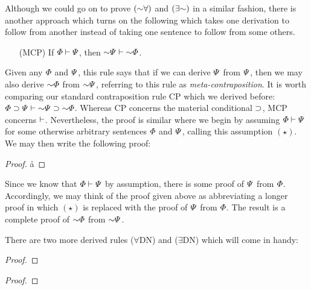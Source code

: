 Although we could go on to prove $(\enot\forall)$ and $(\exists\enot)$ in a similar fashion, there is another approach which turns on the following  which takes one derivation to follow from another instead of taking one sentence to follow from some others.

\begin{enumerate}[leftmargin=.75in]
  \item[(MCP)] If $\varPhi \vdash \varPsi$, then $\enot\metaB \proves \enot\metaA$.
\end{enumerate}

Given any $\varPhi$ and $\varPsi$, this rule says that if we can derive $\varPsi$ from $\varPsi$, then we may also derive $\enot\metaA$ from $\enot\metaB$, referring to this rule as \textit{meta-contraposition}.
It is worth comparing our standard contraposition rule CP which we derived before: $\metaA \eif \metaB \proves \enot\metaB \eif \enot\metaA$.
Whereas CP concerns the material conditional $\supset$, MCP concerns $\vdash$.
Nevertheless, the proof is similar where we begin by assuming $\varPhi \vdash \varPsi$ for some otherwise arbitrary sentences $\varPhi$ and $\varPsi$, calling this assumption $(\star)$.
We may then write the following proof:

\begin{proof}
	     \pr{}
    \open
            \as{}
            \by{$(\star)$}{}
       \r{a}
    \close
       
\end{proof}

Since we know that $\varPhi \vdash \varPsi$ by assumption, there is some proof of $\varPsi$ from $\varPhi$.
Accordingly, we may think of the proof given above as abbreviating a longer proof in which $(\star)$ is replaced with the proof of $\varPsi$ from $\varPhi$.
The result is a complete proof of $\enot\metaA$ from $\enot\metaB$. 

There are two more derived rules ($\forall$DN) and ($\exists$DN) which will come in handy:

\begin{multicols}{2}
  
\begin{proof}
	   \pr{}
    
              
                
\end{proof}

\begin{proof}
	   \pr{}
    \open
        \as{}
                  
                   
    \close
               
\end{proof}

\end{multicols}

